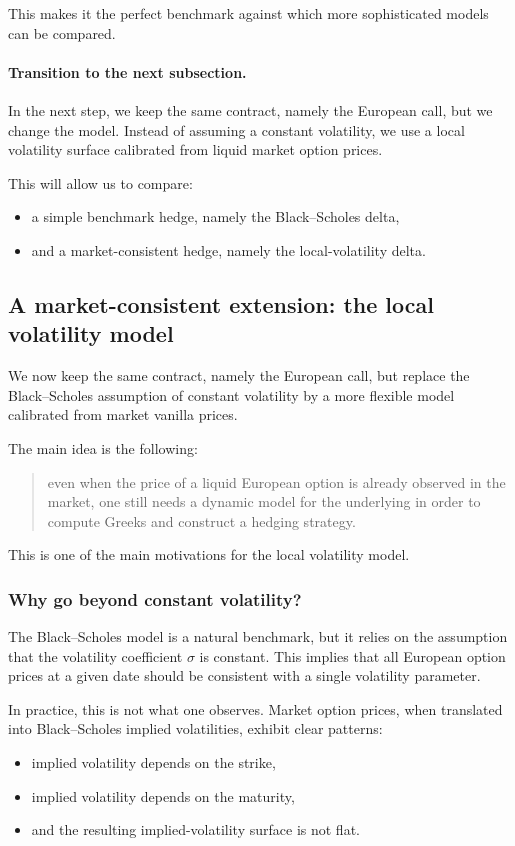 \documentclass[11pt]{article}
\theoremstyle{plain}
\theoremstyle{definition}
\theoremstyle{remark}
\begin{document}
This makes it the perfect benchmark against which more sophisticated
models can be compared.

\paragraph{Transition to the next subsection.}
In the next step, we keep the same contract, namely the European call,
but we change the model.
Instead of assuming a constant volatility, we use a local volatility
surface calibrated from liquid market option prices.

This will allow us to compare:
\begin{itemize}[leftmargin=1.4em]
    \item a simple benchmark hedge, namely the Black--Scholes delta,
    \item and a market-consistent hedge, namely the local-volatility
    delta.
\end{itemize}

\subsection{A market-consistent extension: the local volatility model}

We now keep the same contract, namely the European call, but replace the
Black--Scholes assumption of constant volatility by a more flexible
model calibrated from market vanilla prices.

The main idea is the following:
\begin{quote}
even when the price of a liquid European option is already observed in
the market, one still needs a dynamic model for the underlying in order
to compute Greeks and construct a hedging strategy.
\end{quote}

This is one of the main motivations for the local volatility model.

\subsubsection{Why go beyond constant volatility?}

The Black--Scholes model is a natural benchmark, but it relies on the
assumption that the volatility coefficient \(\sigma\) is constant.
This implies that all European option prices at a given date should be
consistent with a single volatility parameter.

In practice, this is not what one observes.
Market option prices, when translated into Black--Scholes implied
volatilities, exhibit clear patterns:
\begin{itemize}[leftmargin=1.4em]
    \item implied volatility depends on the strike,
    \item implied volatility depends on the maturity,
    \item and the resulting implied-volatility surface is not flat.
\end{itemize}
\end{document}
